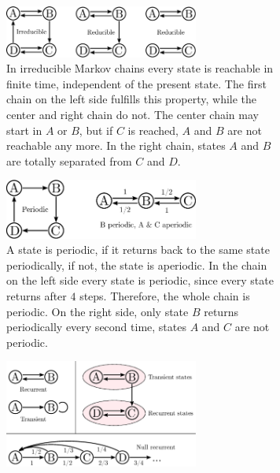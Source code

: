 \begin{figure}
    \centering
    \begin{subfigure}{\textwidth}
    	\centering
        \includegraphics[width=0.7\textwidth]{sorn_markov/mc-irreducible}
        \vspace{5pt}
        \caption{In irreducible Markov chains every state is reachable in finite time, independent of the present state. The first chain on the left side fulfills this property, while the center and right chain do not. The center chain may start in $A$ or $B$, but if $C$ is reached, $A$ and $B$ are not reachable any more. In the right chain, states $A$ and $B$ are totally separated from $C$ and $D$.}
        \vspace{15pt}
        \label{fig:irreducible}
    \end{subfigure}
    \begin{subfigure}{\textwidth}
    	\centering
        \includegraphics[width=0.7\textwidth]{sorn_markov/mc-aperiodic}
        \vspace{5pt}
        \caption{A state is periodic, if it returns back to the same state periodically, if not, the state is aperiodic. In the chain on the left side every state is periodic, since every state returns after $4$ steps. Therefore, the whole chain is periodic. On the right side, only state $B$ returns periodically every second time, states $A$ and $C$ are not periodic.}
        \vspace{15pt}
        \label{fig:aperiodic}
    \end{subfigure}
    \begin{subfigure}{\textwidth}
    	\centering
        \includegraphics[width=0.7\textwidth]{sorn_markov/mc-recurrent}

\end{subfigure}
\end{figure}
